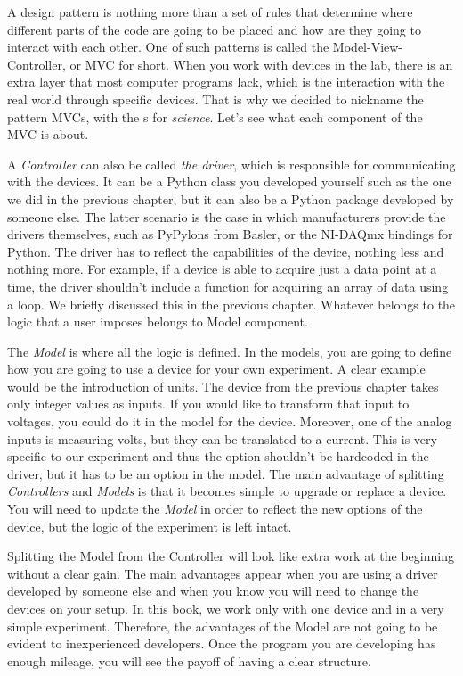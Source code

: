 A design pattern is nothing more than a set of rules that determine where different parts of the code are going to be placed and how are they going to interact with each other. One of such patterns is called the Model-View-Controller, or MVC for short. When you work with devices in the lab, there is an extra layer that most computer programs lack, which is the interaction with the real world through specific devices. That is why we decided to nickname the pattern MVCs, with the s for \emph{science}. Let's see what each component of the MVC is about. 

A \emph{Controller} can also be called \emph{the driver}, which is responsible for communicating with the devices. It can be a Python class you developed yourself such as the one we did in the previous chapter, but it can also be a Python package developed by someone else. The latter scenario is the case in which manufacturers provide the drivers themselves, such as PyPylons from Basler, or the NI-DAQmx bindings for Python. The driver has to reflect the capabilities of the device, nothing less and nothing more. For example, if a device is able to acquire just a data point at a time, the
driver shouldn't include a function for acquiring an array of data using a loop. We briefly discussed this in the previous chapter. Whatever belongs to the logic that a user imposes belongs to Model component. 

The \emph{Model} is where all the logic is defined. In the models, you are going to define how you are going to use a device for your own experiment. A clear example would be the introduction of units. The device from the previous chapter takes only integer values as inputs. If you would like to transform that input to voltages, you could do it in the model for the device. Moreover, one of the analog inputs is measuring volts, but they can be translated to a current. This is very specific to our experiment and thus the option shouldn't be hardcoded in the driver, but it has to be an option in the model. The main advantage of splitting \emph{Controllers} and \emph{Models} is that it becomes simple to upgrade or replace a device. You will need to update the \emph{Model} in order to reflect the new options of the device, but the logic of the experiment is left intact. 

Splitting the Model from the Controller will look like extra work at the beginning without a clear gain. The main advantages appear when you are using a driver developed by someone else and when you know you will need to change the devices on your setup. In this book, we work only with one device and in a very simple experiment. Therefore, the advantages of the Model are not going to be evident to inexperienced developers. Once the program you are developing has enough mileage, you will see the payoff of having a clear structure. 

